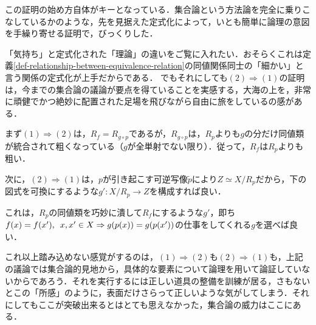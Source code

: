 \documentclass[uplatex,dvipdfmx]{jsreport}
\begin{document}
\begin{remark}
    この証明の始め方自体がキーとなっている．集合論という方法論を完全に乗りこなしているかのような，先を見据えた定式化によって，いとも簡単に論理の意図を手繰り寄せる証明で，びっくりした．

    「気持ち」と定式化された「理論」の違いをご覧に入れたい．おそらくこれは定義\ref{def-relationship-between-equivalence-relation}の同値関係同士の「細かい」と言う関係の定式化が上手だからである．
    でもそれにしても$(2)\Rightarrow (1)$の証明は，今までの集合論の議論が要点を得ていることを実感する，大海の上を，非常に頑健でかつ絶妙に配置された足場を飛びながら自由に旅をしているの感がある．

    まず$(1)\Rightarrow (2)$は，$R_f=R_{g\circ p}$であるが，$R_{g\circ p}$は，$R_p$よりも$g$の分だけ同値類が統合されて粗くなっている（$g$が全単射でない限り）．従って，$R_f$は$R_p$よりも粗い．

    次に，$(2)\Rightarrow (1)$は，$p$が引き起こす可逆写像$\tilde{p}$により$Z\simeq X/R_p$だから，下の図式を可換にするような$g':X/R_p\to Z$を構成すれば良い．
    \begin{center}\end{center}
    これは，$R_p$の同値類を巧妙に潰して$R_f$にするような$g'$，即ち$f(x)=f(x'),\hspace{0.5em} x,x'\in X \Rightarrow g(p(x))=g(p(x'))$の仕事をしてくれる$g$を選べば良い．

    これ以上踏み込めない感覚がするのは，$(1)\Rightarrow (2)$も$(2)\Rightarrow (1)$も，上記の議論では集合論的見地から，具体的な要素について論理を用いて論証していないからであろう．それを実行するには正しい道具の整備を訓練が居る，さもないとこの「所感」のように，表面だけさらって正しいような気がしてしまう．それにしてもここが突破出来るとはとても思えなかった，集合論の威力はここにある．
\end{remark}
\end{document}

